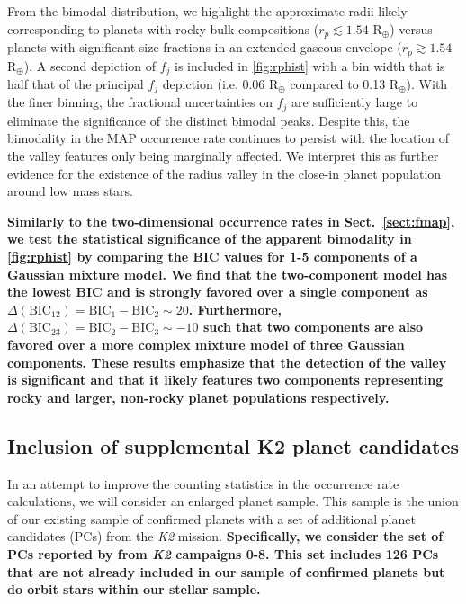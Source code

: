 \documentclass[twocolumn]{emulateapj}
\newcommand{\ktwo}[1]{\emph{K2}#1}
\begin{document}
From the bimodal distribution, we highlight the approximate radii likely corresponding to planets with rocky
bulk compositions ($r_p\lesssim 1.54$ R$_{\oplus}$) versus planets with significant size fractions in an extended
gaseous envelope ($r_p\gtrsim 1.54$ R$_{\oplus}$).
A second depiction of $f_j$ is included in \autoref{fig:rphist} with a bin width that is half that of the principal
$f_j$ depiction (i.e. 0.06 R$_{\oplus}$ compared to 0.13 R$_{\oplus}$).
With the finer binning, the fractional uncertainties on $f_j$ are sufficiently
large to eliminate the significance of the distinct bimodal peaks. Despite this, the bimodality in the MAP
occurrence rate continues to persist with the location of the valley features only being marginally affected.
We interpret this as further evidence for the existence of the radius valley in the close-in planet population
around low mass stars.


\textbf{Similarly to the two-dimensional occurrence rates in Sect.~\ref{sect:fmap}, we test the statistical significance
of the apparent bimodality in \autoref{fig:rphist} by comparing the BIC values for 1-5 components of a Gaussian
mixture model. We find that the two-component model has the lowest BIC and is strongly favored over a single
component as $\Delta(\text{BIC}_{12})=\text{BIC}_1-\text{BIC}_2 \sim 20$. Furthermore, 
$\Delta(\text{BIC}_{23})=\text{BIC}_2-\text{BIC}_3 \sim -10$ such that two components are also favored over
a more complex mixture model of three Gaussian components. These results emphasize
that the detection of the valley is significant and that it likely features two components representing
rocky and larger, non-rocky planet populations respectively.}


\subsection{Inclusion of supplemental K2 planet candidates}
In an attempt to improve the counting statistics in the occurrence rate calculations,
we will consider an enlarged planet sample. This sample is the union of our existing sample of confirmed planets
with a set of additional planet candidates (PCs) from the \ktwo{}
mission. \textbf{Specifically, we consider the set of PCs reported by \cite{kruse19}
from \ktwo{} campaigns 0-8. This set includes 126 PCs that are not already included in our sample of confirmed
planets but do orbit stars within our stellar sample.}
\end{document}
